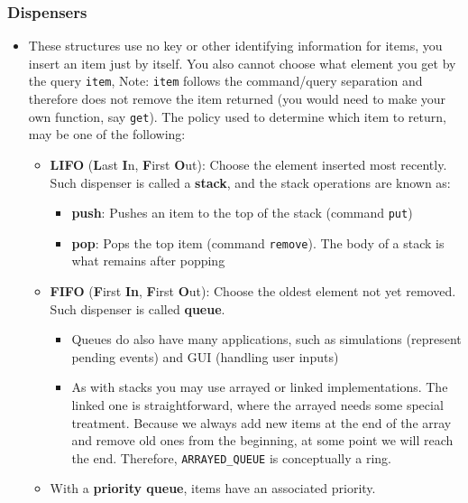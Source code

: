 \documentclass[a4paper]{article}
\newcommand{\inline}[1]{\lstinline!#1!}%
\begin{document}
\subsubsection{Dispensers}
\begin{itemize}
\item These structures use no key or other identifying information for items, you insert an item just by itself. You also cannot choose what element you get by the query \inline{item}, Note: \inline{item} follows the command/query separation and therefore does not remove the item returned (you would need to make your own function, say \inline{get}). The policy used to determine which item to return, may be one of the following:
\begin{itemize}
\item \textbf{LIFO} (\textbf{L}ast \textbf{I}n, \textbf{F}irst \textbf{O}ut): Choose the element inserted most recently. Such dispenser is called a \textbf{stack}, and the stack operations are known as:
\begin{itemize}
\item \textbf{push}: Pushes an item to the top of the stack (command \inline{put})
\item \textbf{pop}: Pops the top item (command \inline{remove}). The body of a stack is what remains after popping
\end{itemize}
\item \textbf{FIFO} (\textbf{F}irst \textbf{In}, \textbf{F}irst \textbf{O}ut): Choose the oldest element not yet removed. Such dispenser is called \textbf{queue}.
\begin{itemize}
\item Queues do also have many applications, such as simulations (represent pending events) and GUI (handling user inputs)
\item As with stacks you may use arrayed or linked implementations. The linked one is straightforward, where the arrayed needs some special treatment. Because we always add new items at the end of the array and remove old ones from the beginning, at some point we will reach the end. Therefore, \inline{ARRAYED_QUEUE} is conceptually a ring.
\end{itemize}
\item With a \textbf{priority queue}, items have an associated priority.
\end{itemize}
\end{itemize}
\end{document}
